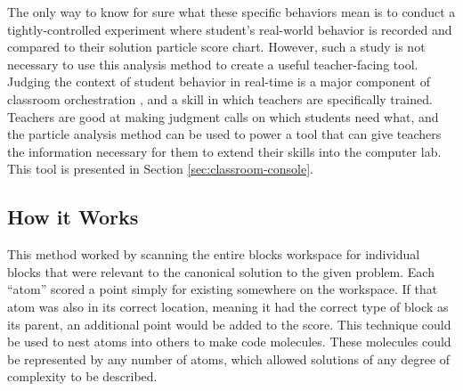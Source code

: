 The only way to know for sure what these specific behaviors mean is to conduct a tightly-controlled experiment where student's real-world behavior is recorded and compared to their solution particle score chart. However, such a study is not necessary to use this analysis method to create a useful teacher-facing tool. Judging the context of student behavior in real-time is a major component of classroom orchestration \citep{dillenbourg2012design}, and a skill in which teachers are specifically trained. Teachers are good at making judgment calls on which students need what, and the particle analysis method can be used to power a tool that can give teachers the information necessary for them to extend their skills into the computer lab. This tool is presented in Section \ref{sec:classroom-console}.


\subsection{How it Works}
This method worked by scanning the entire blocks workspace for individual blocks that were relevant to the canonical solution to the given problem. Each ``atom'' scored a point simply for existing somewhere on the workspace. If that atom was also in its correct location, meaning it had the correct type of block as its parent, an additional point would be added to the score. This technique could be used to nest atoms into others to make code molecules. These molecules could be represented by any number of atoms, which allowed solutions of any degree of complexity to be described.


